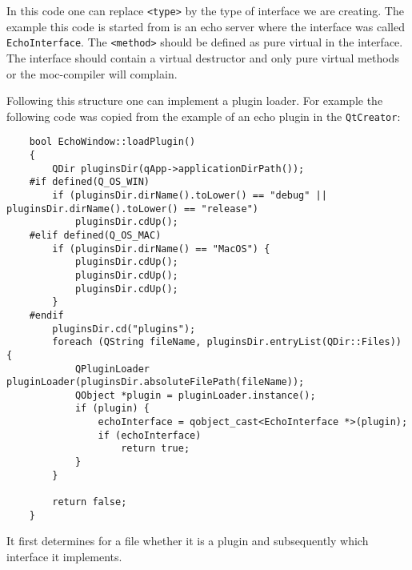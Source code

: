 \documentclass[a4paper,11pt,final]{article}
\newcommand{\code}[1]{\texttt{#1}\xspace}%
\begin{document}
In this code one can replace \verb=<type>= by the type of interface we are creating. The 
example this code is started from is an echo server where the interface was called 
\code{EchoInterface}. The \verb=<method>= should be defined as pure virtual in the interface.
The interface should contain a virtual destructor and only pure virtual methods or the
moc-compiler will complain.

Following this structure one can implement a plugin loader. For example the following code was 
copied from the example of an echo plugin in the \code{QtCreator}:

\begin{verbatim}
	bool EchoWindow::loadPlugin()
	{
	    QDir pluginsDir(qApp->applicationDirPath());
	#if defined(Q_OS_WIN)
	    if (pluginsDir.dirName().toLower() == "debug" || pluginsDir.dirName().toLower() == "release")
	        pluginsDir.cdUp();
	#elif defined(Q_OS_MAC)
	    if (pluginsDir.dirName() == "MacOS") {
	        pluginsDir.cdUp();
	        pluginsDir.cdUp();
	        pluginsDir.cdUp();
	    }
	#endif
	    pluginsDir.cd("plugins");
	    foreach (QString fileName, pluginsDir.entryList(QDir::Files)) {
	        QPluginLoader pluginLoader(pluginsDir.absoluteFilePath(fileName));
	        QObject *plugin = pluginLoader.instance();
	        if (plugin) {
	            echoInterface = qobject_cast<EchoInterface *>(plugin);
	            if (echoInterface)
	                return true;
	        }
	    }
	
	    return false;
	}
\end{verbatim}

It first determines for a file whether it is a plugin and subsequently which interface
it implements.
\end{document}
